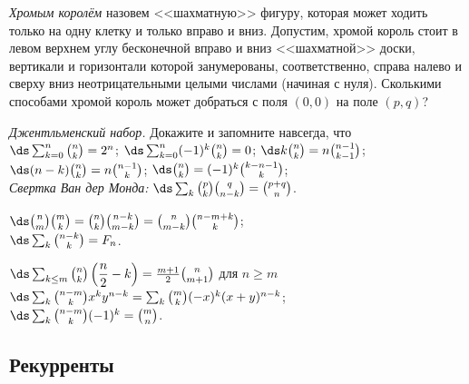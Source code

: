 \begin{problems}

\item
\emph{Хромым королём} назовем <<шахматную>> фигуру, которая может ходить только
на одну клетку и только вправо и вниз.
Допустим, хромой король стоит в левом верхнем углу бесконечной вправо и вниз
<<шахматной>> доски, вертикали и горизонтали которой занумерованы,
соответственно, справа налево и сверху вниз неотрицательными целыми числами
(начиная с нуля).
Сколькими способами хромой король может добраться с поля $(0, 0)$ на поле
$(p, q)$?

\item\emph{Джентльменский набор.}
Докажите и запомните навсегда, что
\\[1ex]
\sbp
\(\ds
    \sum_{k = 0}^n
        \binom{n}{k}
=
    2^n
\);
\qquad
\sbp
\(\ds
    \sum_{k = 0}^n
        (-1)^{k} \binom{n}{k}
=
    0
\);
\qquad
\sbp
\(\ds
    k \binom{n}{k}
=
    n \binom{n-1}{k-1}
\);
\\[0.5ex]
\sbp
\(\ds
    (n - k) \binom{n}{k}
=
    n \binom{n-1}{k}
\);
\qquad
\sbp
\(\ds
    \binom{n}{k}
=
    (-1)^k \binom{k - n - 1}{k}
\);
\\[1ex]
\sbp\emph{Свертка Ван дер Монда:}
\quad
\(\ds
    \sum_{k}
        \binom{p}{k}
        \binom{q}{n - k}
=
    \binom{p + q}{n}
\).

\item
\sbp
\(\ds
    \binom{n}{m} \binom{m}{k}
=
    \binom{n}{k} \binom{n - k}{m - k}
=
    \binom{n}{m - k}
    \binom{n - m + k}{k}
\);
\\[1ex]
\sbp
\(\ds
    \sum_{k}
        \binom{n - k}{k}
=
    F_n
\).

\item
\sbp
\(\ds
    \sum_{k \leq m}
        \binom{n}{k}
        \left(
            \dfrac{n}{2} - k
        \right)
=
    \frac{m + 1}{2}
    \binom{n}{m + 1}
\)
для $n\geq m$
\\[0.5ex]
\sbp
\(\ds
    \sum_{k}
    \binom{n - m}{k}
    x^k y^{n - k}
=
    \sum_{k}
        \binom{m}{k}
        (-x)^k (x + y)^{n - k}
\);
\\[0.5ex]
\sbp
\(\ds
    \sum_{k}
        \binom{n - m}{k}
        (-1)^k
=
    \binom{m}{n}
\).

\end{problems}

\subsection*{Рекурренты}

